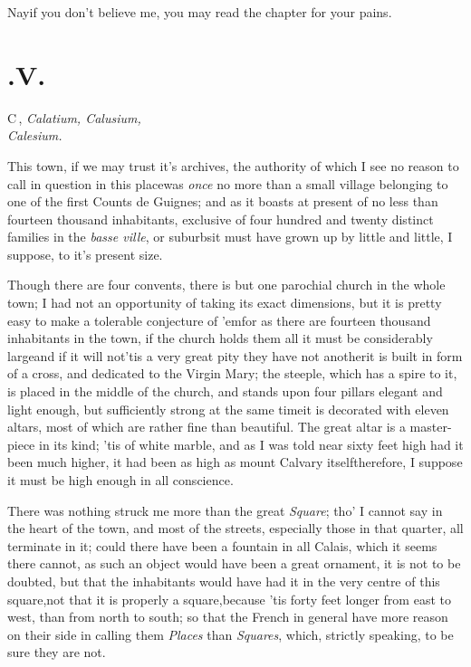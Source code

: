 \documentclass{article}
\begin{document}
\tsk Nay\tsk if you don’t believe me, you may read the
chapter for your pains.

\section{.\enspace V.}

\lettrine{C}{\,}, \textit{Calatium, Calusium,\\
Calesium.}

This town, if we may trust it's archives, the authority of which
I see no reason to call in question in this place\tsk was
\textit{once} no more than a small village belonging to one of the
first Counts de Guignes; and as it boasts at present of no
less than fourteen thousand inhabitants, exclusive of four hundred
and twenty distinct families in the \textit{basse ville}, or
suburbs\tsh it must have grown up by little and little, I
suppose, to it's present size.

Though there are four convents, there is but one parochial church in the whole town;
I had not an opportunity of taking its exact dimensions, but it is pretty easy to
make a tolerable conjecture of ’em\tsk\break for as there are fourteen thousand
inhabitants in the town, if the church holds them all it must be considerably
large\tsk and if it will not\tsk ’tis a very great pity they have not another\tsk it
is built in form of a cross, and dedicated to the Virgin Mary; the steeple, which
has a spire to it, is placed in the middle of the church, and stands upon four
pillars elegant and light enough, but sufficiently strong at the same time\tsk it is
decorated with eleven altars, most of which are rather fine than beautiful. The
great altar is a master-piece in its kind; ’tis of white marble, and as I was
told near sixty feet high\tsk{} had it been much higher, it had been as high as
mount Calvary itself\tsk therefore, I suppose it must be high enough in all
conscience.

There was nothing struck me more than the great \textit{Square};
tho’ I cannot say\break
{}\break in the heart of the town, and most of the streets,
especially those in that quarter, all terminate in it; could there
have been a fountain in all Calais, which it seems there
cannot, as such an object would have been a great ornament, it is
not to be doubted, but that the inhabitants would have had it in
the very centre of this square,\tsk not that it is properly a
square,\break\tsk because ’tis forty feet longer from
east to west, than from north to south; so that the French
in general have more reason on their side in calling them
\textit{Places} than \textit{Squares}, which, strictly speaking, to be
sure they are not.
\end{document}
